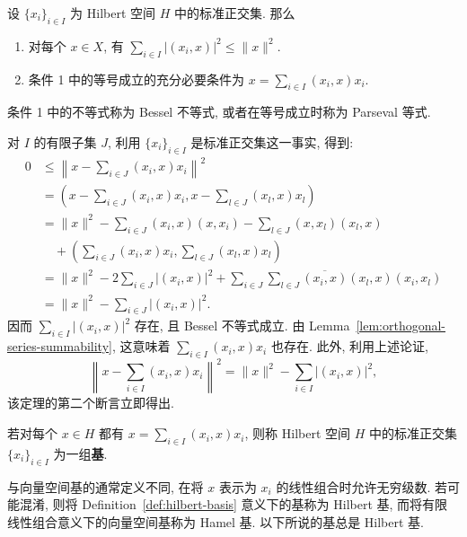 \begin{Theorem}
\label{thm:bessel-parseval-orthonormal-expansion}
设 $\{x_i\}_{i\in I}$ 为 Hilbert 空间 $H$ 中的标准正交集. 那么\begin{enumerate}
\item 对每个 $x\in X$, 有 $\sum_{i\in I}|(x_i,x)|^2\leq\|x\|^2$.
\item 条件 1 中的等号成立的充分必要条件为 $x=\sum_{i\in I}(x_i,x)x_i$.
\end{enumerate}
\end{Theorem}

条件 1 中的不等式称为 Bessel 不等式, 或者在等号成立时称为 Parseval 等式.

\begin{Proof}
对 $I$ 的有限子集 $J$, 利用 $\{x_i\}_{i\in I}$ 是标准正交集这一事实, 得到:\[
\begin{aligned}
0&\leq\left\|x-\sum_{i\in J}(x_i,x)x_i\right\|^2\\
&=\left(x-\sum_{i\in J}(x_i,x)x_i,x-\sum_{l\in J}(x_l,x)x_l\right)\\
&=\|x\|^2-\sum_{i\in J}(x_i,x)(x,x_i)-\sum_{l\in J}(x,x_l)(x_l,x)\\
&\quad+\left(\sum_{i\in J}(x_i,x)x_i,\sum_{l\in J}(x_l,x)x_l\right)\\
&=\|x\|^2-2\sum_{i\in J}|(x_i,x)|^2+\sum_{i\in J}\sum_{l\in J}\overline{(x_i,x)}(x_l,x)(x_i,x_l)\\
&=\|x\|^2-\sum_{i\in J}|(x_i,x)|^2.
\end{aligned}
\]因而 $\sum_{i\in I}|(x_i,x)|^2$ 存在, 且 Bessel 不等式成立. 由 Lemma~\ref{lem:orthogonal-series-summability}, 这意味着 $\sum_{i\in I}(x_i,x)x_i$ 也存在. 此外, 利用上述论证,
\begin{equation}\label{eq:orthonormal-expansion-remainder-norm-identity}
\left\|x-\sum_{i\in I}(x_i,x)x_i\right\|^2=\|x\|^2-\sum_{i\in I}|(x_i,x)|^2,
\end{equation}
该定理的第二个断言立即得出.
\end{Proof}

\begin{Definition}
\label{def:hilbert-basis}
若对每个 $x\in H$ 都有 $x=\sum_{i\in I}(x_i,x)x_i$, 则称 Hilbert 空间 $H$ 中的标准正交集 $\{x_i\}_{i\in I}$ 为一组\textbf{基}.
\end{Definition}

与向量空间基的通常定义不同, 在将 $x$ 表示为 $x_i$ 的线性组合时允许无穷级数. 若可能混淆, 则将 Definition~\ref{def:hilbert-basis} 意义下的基称为 Hilbert 基, 而将有限线性组合意义下的向量空间基称为 Hamel 基. 以下所说的基总是 Hilbert 基.
